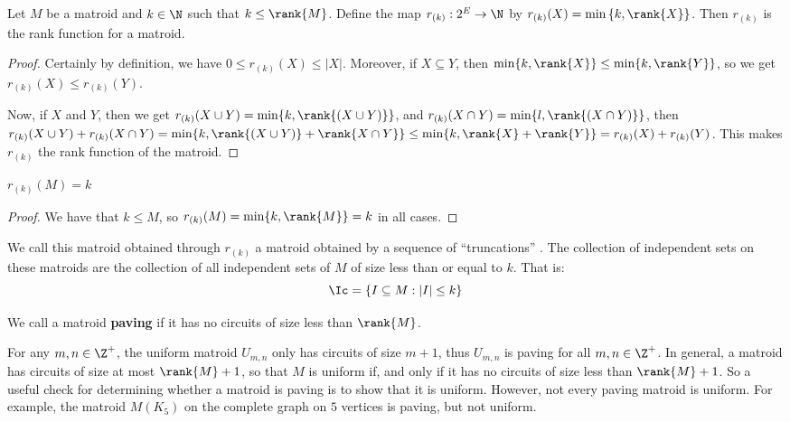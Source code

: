 \begin{lemma}\label{1.3.5}
    Let $M$ be a matroid and  $k \in \N$ such that  $k \leq \rank{M}$. Define
    the map $r_{(k)}:2^E \rightarrow \N$ by $r_{(k)}(X)=\min{\{k,\rank{X}\}}$.
    Then $r_{(k)}$ is the rank function for a matroid.
\end{lemma}
\begin{proof}
    Certainly by definition, we have $0 \leq r_{(k)}(X) \leq |X|$. Moreover, if
    $X \subseteq Y$, then  $\min\{k,\rank{X}\} \leq \min\{k,\rank{Y}\}$, so we get
    $r_{(k)}(X) \leq r_{(k)}(Y)$.

    Now, if $X$ and  $Y$, then we get $r_{(k)}(X \cup Y)=\min\{k,\rank{(X \cup
    Y)}\}$, and $r_{(k)}(X \cap Y)=\min\{l, \rank{(X \cap Y)}\}$, then
    $r_{(k)}(X \cup Y)+r_{(k)}(X \cap Y)=\min\{k, \rank{(X \cup Y)}+\rank{X \cap
    Y}\} \leq \min\{k, \rank{X}+\rank{Y}\}=r_{(k)}(X)+r_{(k)}(Y)$. This makes
    $r_{(k)}$ the rank function of the matroid.
\end{proof}
\begin{corollary}
    $r_{(k)}(M)=k$
\end{corollary}
\begin{proof}
    We have that $k \leq M$, so  $r_{(k)}(M)=\min\{k,\rank{M}\}=k$ in all cases.
\end{proof}
\begin{remark}
    We call this matroid obtained through $r_{(k)}$ a matroid obtained by a
    sequence of ``truncations'' . The collection of independent sets on these
    matroids are the collection of all independent sets of $M$ of size less than
    or equal to  $k$. That is:
    \begin{equation*}
        \Ic=\{I \subseteq M : |I| \leq k\}
    \end{equation*}
\end{remark}

\begin{definition}
    We call a matroid \textbf{paving} if it has no circuits of size less than
    $\rank{M}$.
\end{definition}

\begin{example}\label{1.13}
    For any $m,n \in \Z^+$, the uniform matroid  $U_{m,n}$ only has circuits of
    size $m+1$, thus  $U_{m,n}$ is paving for all $m,n \in \Z^+$. In general, a
    matroid has circuits of size at most  $\rank{M}+1$, so that $M$ is uniform
    if, and only if it has no circuits of size less than $\rank{M}+1$. So a
    useful check for determining whether a matroid is paving is to show that it
    is uniform. However, not every paving matroid is uniform. For example, the
    matroid $M(K_5)$ on the complete graph on $5$ vertices is paving, but not
    uniform.
\end{example}

